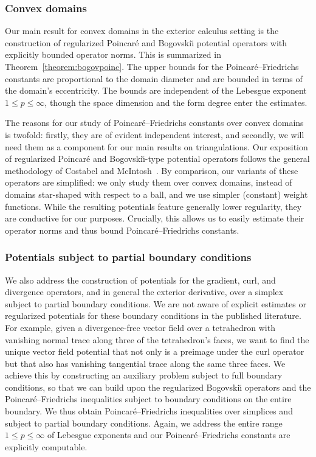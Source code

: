 \documentclass[10pt,a4paper]{article}
\begin{document}
\subsubsection{Convex domains}

Our main result for convex domains in the exterior calculus setting is the construction of regularized Poincar\'e and Bogovski\u{\i} potential operators with explicitly bounded operator norms. 
This is summarized in Theorem~\ref{theorem:bogovpoinc}. 
The upper bounds for the Poincar\'e--Friedrichs constants are proportional to the domain diameter and are bounded in terms of the domain's eccentricity. 
The bounds are independent of the Lebesgue exponent $1 \leq p \leq \infty$, though the space dimension and the form degree enter the estimates. 

The reasons for our study of Poincar\'e--Friedrichs constants over convex domains is twofold: 
firstly, they are of evident independent interest, and secondly, we will need them as a component for our main results on triangulations. 
Our exposition of regularized Poincar\'e and Bogovski\u{\i}-type potential operators follows the general methodology of Costabel and McIntosh~\cite{costabel2010bogovskiui}.
By comparison, our variants of these operators are simplified: 
we only study them over convex domains, instead of domains star-shaped with respect to a ball, 
and we use simpler (constant) weight functions. 
While the resulting potentials feature generally lower regularity, they are conductive for our purposes. 
Crucially, this allows us to easily estimate their operator norms and thus bound Poincar\'e--Friedrichs constants. 


\subsubsection{Potentials subject to partial boundary conditions}

We also address the construction of potentials for the gradient, curl, and divergence operators, and in general the exterior derivative, over a simplex subject to partial boundary conditions. 
We are not aware of explicit estimates or regularized potentials for these boundary conditions in the published literature. 
For example, given a divergence-free vector field over a tetrahedron with vanishing normal trace along three of the tetrahedron's faces, 
we want to find the unique vector field potential that not only is a preimage under the curl operator but that also has vanishing tangential trace along the same three faces. 
We achieve this by constructing an auxiliary problem subject to full boundary conditions,
so that we can build upon the regularized Bogovski\u{\i} operators and the Poincar\'e--Friedrichs inequalities subject to boundary conditions on the entire boundary.
We thus obtain Poincar\'e--Friedrichs inequalities over simplices and subject to partial boundary conditions. 
Again, we address the entire range $1 \leq p \leq \infty$ of Lebesgue exponents and our Poincar\'e--Friedrichs constants are explicitly computable. 
\end{document}
